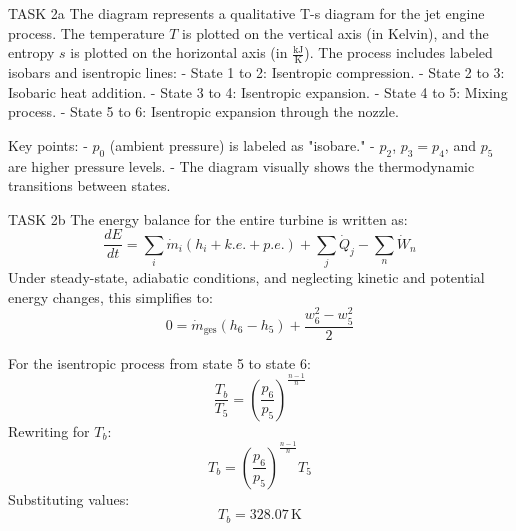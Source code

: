TASK 2a  
The diagram represents a qualitative T-s diagram for the jet engine process. The temperature \( T \) is plotted on the vertical axis (in Kelvin), and the entropy \( s \) is plotted on the horizontal axis (in \( \frac{\text{kJ}}{\text{K}} \)). The process includes labeled isobars and isentropic lines:  
- State 1 to 2: Isentropic compression.  
- State 2 to 3: Isobaric heat addition.  
- State 3 to 4: Isentropic expansion.  
- State 4 to 5: Mixing process.  
- State 5 to 6: Isentropic expansion through the nozzle.  

Key points:  
- \( p_0 \) (ambient pressure) is labeled as "isobare."  
- \( p_2 \), \( p_3 = p_4 \), and \( p_5 \) are higher pressure levels.  
- The diagram visually shows the thermodynamic transitions between states.  

TASK 2b  
The energy balance for the entire turbine is written as:  
\[
\frac{dE}{dt} = \sum_i \dot{m}_i \left( h_i + k.e. + p.e. \right) + \sum_j \dot{Q}_j - \sum_n \dot{W}_n
\]  
Under steady-state, adiabatic conditions, and neglecting kinetic and potential energy changes, this simplifies to:  
\[
0 = \dot{m}_{\text{ges}} \left( h_6 - h_5 \right) + \frac{w_6^2 - w_5^2}{2}
\]  

For the isentropic process from state 5 to state 6:  
\[
\frac{T_b}{T_5} = \left( \frac{p_6}{p_5} \right)^{\frac{n-1}{n}}
\]  
Rewriting for \( T_b \):  
\[
T_b = \left( \frac{p_6}{p_5} \right)^{\frac{n-1}{n}} T_5
\]  
Substituting values:  
\[
T_b = 328.07 \, \text{K}
\]